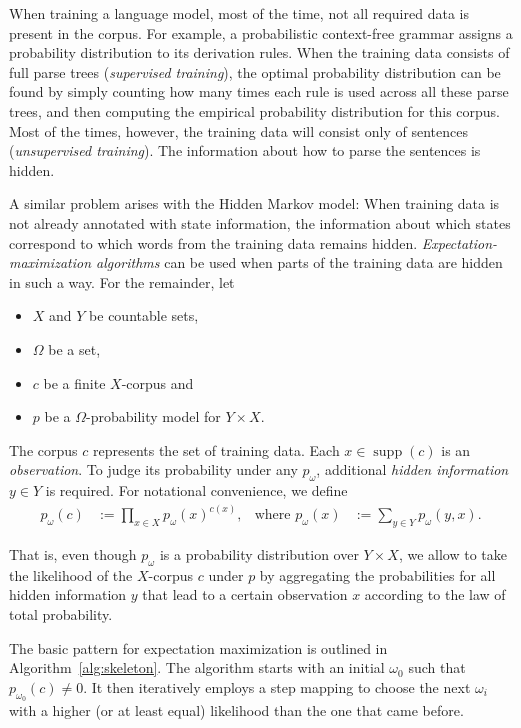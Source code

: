 When training a language model, most of the time, not all required data is
present in the corpus. For example, a probabilistic context-free grammar
assigns a probability distribution to its derivation rules. \cite{laryou90}
When the training data consists of full parse trees (\emph{supervised
training}), the optimal probability distribution can be found by simply
counting how many times each rule is used across all these parse trees, and
then computing the empirical probability distribution for this corpus. Most of
the times, however, the training data will consist only of sentences
(\emph{unsupervised training}). The information about how to parse the
sentences is hidden.

A similar problem arises with the Hidden Markov model: When training data is
not already annotated with state information, the information about which
states correspond to which words from the training data remains hidden.
\emph{Expectation-maximization algorithms} can be used when parts of the
training data are hidden in such a way. For the remainder,
let\label{02-basic-requirements}
\begin{itemize}\setlength\itemsep{-0.3em}
 \item $X$ and $Y$ be countable sets,
 \item $\Omega$ be a set,
 \item $c$ be a finite $X$-corpus and
 \item $p$ be a $\Omega$-probability model for $Y\times X$.
\end{itemize}

The corpus $c$ represents the set of training data. Each $x\in\operatorname{supp}(c)$ is
an \emph{observation}. To judge its probability under any $p_\omega$, additional
\emph{hidden information} $y\in Y$ is required. For notational convenience, we define
\begin{align*}
 p_\omega(c) &:= \prod_{x\in X} p_\omega(x)^{c(x)}, &
 \text{where } p_\omega(x) &:= \sum_{y\in Y} p_\omega(y,x).
\end{align*}

That is, even though $p_\omega$ is a probability distribution over $Y\times X$,
we allow to take the likelihood of the $X$-corpus $c$ under $p$ by aggregating
the probabilities for all hidden information $y$ that lead to a certain
observation $x$ according to the law of total probability.

The basic pattern for expectation maximization is outlined in
Algorithm~\ref{alg:skeleton}. The algorithm starts with an initial $\omega_0$
such that $p_{\omega_0}(c) \neq 0$. It then iteratively employs a step mapping
to choose the next $\omega_i$ with a higher (or at least equal) likelihood than
the one that came before.

